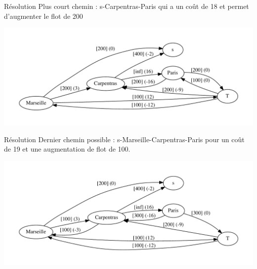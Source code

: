 \begin{frame}{Résolution}
    Plus court chemin : s-Carpentras-Paris qui a un coût de 18 et permet d'augmenter le flot de 200
    \begin{center}
        \includegraphics[width=\textwidth]{tutorials/flmcmin/fleurs-5.pdf}
    \end{center}
\end{frame}

\begin{frame}{Résolution}
    Dernier chemin possible : s-Marseille-Carpentras-Paris pour un coût de 19 et une augmentation de flot de 100.
    \begin{center}
        \includegraphics[width=\textwidth]{tutorials/flmcmin/fleurs-6.pdf}
    \end{center}
\end{frame}
